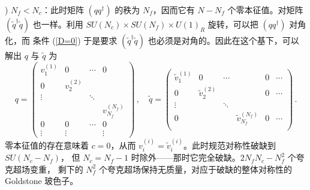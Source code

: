 ) $N_f < N_c$：此时矩阵 $(qq^\dagger)$ 的秩为 $N_f$，因而它有
$N-N_f$ 个零本征值。对矩阵 $(\widetilde q^\dagger\widetilde q)$ 也一样。利用
$SU(N_c)\times SU(N_f)\times U(1)_R$ 旋转，可以把 $(qq^\dagger)$ 对角化，而
条件 (\ref{D=0}) 于是要求 $(\widetilde
q^\dagger\widetilde q)$ 也必须是对角的。因此在这个基下，可以解出 $q$ 与
$\widetilde q$ 为
$$
q = \left(
\begin{array}{cccc}
v^{(1)}_1 & 0 &\cdots&0\\
0 & v^{(2)}_2 &&\\
\vdots&&\ddots & \\
&&&v^{(N_f)}_{N_f}\\
0&0&\cdots&0\\
\vdots&\vdots&&\vdots
\end{array}
\right)\,, \quad
\widetilde q = \left(
\begin{array}{cccccc}
\tilde v^{(1)}_1 & 0 & \cdots & & 0 & \cdots \\
 0 & \tilde v^{(2)}_2 & & & 0 & \cdots \\
\vdots  & & \ddots &  &   &  \\
 0 & & &\tilde v^{(N_f)}_{N_f} & 0 & \cdots  \\
\end{array}
\right)\,.
$$
零本征值的存在意味着 $c = 0$，从而
$v^{(i)}_i =\tilde{v}^{(i)}_i$。此时规范对称性破缺到 $SU(N_c-N_f)$，
但 $N_c=N_f-1$ 时除外——那时它完全破缺。$2N_fN_c-N^2_f$ 个夸克超场变重，
剩下的 $N^2_f$ 个夸克超场保持无质量，对应于破缺的整体对称性的 Goldstone 玻色子。

